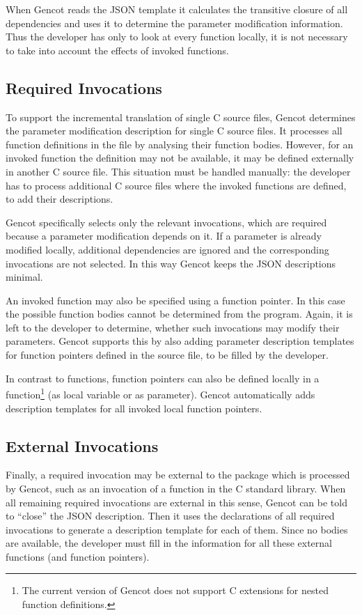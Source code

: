 When Gencot reads the JSON template it calculates the transitive closure of all dependencies and uses it to
determine the parameter modification information. Thus the developer has only to look at every function locally,
it is not necessary to take into account the effects of invoked functions.

\subsection{Required Invocations}

To support the incremental translation of single C source files, Gencot determines the parameter modification
description for single C source files. It processes all function definitions in the file by analysing their 
function bodies. However, for an invoked function the definition may not be available, it may be defined externally
in another C source file. This situation must be handled manually: the developer has to process additional
C source files where the invoked functions are defined, to add their descriptions.

Gencot specifically selects only the relevant invocations, which are required because a parameter modification depends on it.
If a parameter is already modified locally, additional dependencies are ignored and the corresponding invocations
are not selected. In this way Gencot keeps the JSON descriptions minimal.

An invoked function may also be specified using a function pointer. In this case the possible function bodies cannot 
be determined from the program. Again, it is left to the developer to determine, whether such invocations may modify
their parameters. Gencot supports this by also adding parameter description templates for function pointers defined in the 
source file, to be filled by the developer. 

In contrast to functions, function pointers can also be defined locally in a function\footnote{The current version of
Gencot does not support C extensions for nested function definitions.} (as local variable or as parameter). Gencot
automatically adds description templates for all invoked local function pointers.

\subsection{External Invocations}

Finally, a required invocation may be external to the package which is processed by Gencot, such as an invocation of
a function in the C standard library. When all remaining required invocations are external in this sense, Gencot
can be told to ``close'' the JSON description. Then it uses the declarations of all required invocations to generate
a description template for each of them. Since no bodies are available, the developer must fill in the information
for all these external functions (and function pointers).

